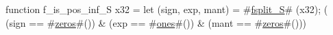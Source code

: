 function f_is_pos_inf_S   x32 = {
  let (sign, exp, mant) = #\hyperref[sailRISCVzfsplitzyS]{fsplit\_S}# (x32);
  (  (sign == #\hyperref[sailRISCVzzzeros]{zeros}#())
   & (exp  == #\hyperref[sailRISCVzones]{ones}#())
   & (mant == #\hyperref[sailRISCVzzzeros]{zeros}#()))
}

